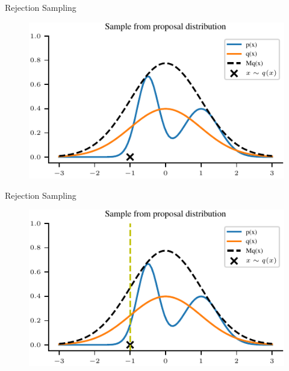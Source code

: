 \documentclass[handout]{beamer}
\begin{document}
    \begin{frame}{Rejection Sampling}
        \begin{figure}
            \centering
            \includegraphics{notebooks/figures/sampling/rejection-sampling--1.0-True-True-True-False-False-False-False-False.pdf}
        \end{figure}
    \end{frame}

    \begin{frame}{Rejection Sampling}
        \begin{figure}
            \centering
            \includegraphics{notebooks/figures/sampling/rejection-sampling--1.0-True-True-True-True-False-False-False-False.pdf}
        \end{figure}
    \end{frame}
\end{document}
